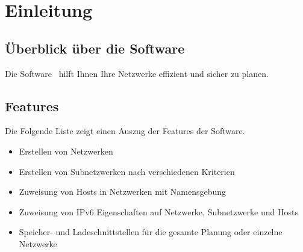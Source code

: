 \section{Einleitung}

\subsection{Überblick über die Software}
Die Software \subnetcalc\ hilft Ihnen Ihre Netzwerke effizient und sicher zu planen.

\subsection{Features}
Die Folgende Liste zeigt einen Auszug der Features der Software.
\begin{itemize}
    \item Erstellen von Netzwerken
    \item Erstellen von Subnetzwerken nach verschiedenen Kriterien
    \item Zuweisung von Hosts in Netzwerken mit Namensgebung
    \item Zuweisung von IPv6 Eigenschaften auf Netzwerke, Subnetzwerke und Hosts
    \item Speicher- und Ladeschnittstellen für die gesamte Planung oder einzelne Netzwerke
\end{itemize}